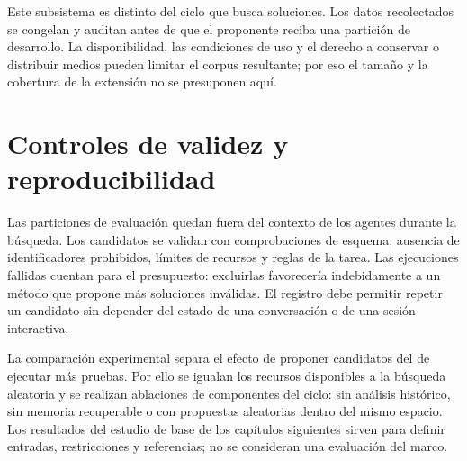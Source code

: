 Este subsistema es distinto del ciclo que busca soluciones. Los datos recolectados se congelan y auditan antes de que el proponente reciba una partición de desarrollo. La disponibilidad, las condiciones de uso y el derecho a conservar o distribuir medios pueden limitar el corpus resultante; por eso el tamaño y la cobertura de la extensión no se presuponen aquí.

\section{Controles de validez y reproducibilidad}

Las particiones de evaluación quedan fuera del contexto de los agentes durante la búsqueda. Los candidatos se validan con comprobaciones de esquema, ausencia de identificadores prohibidos, límites de recursos y reglas de la tarea. Las ejecuciones fallidas cuentan para el presupuesto: excluirlas favorecería indebidamente a un método que propone más soluciones inválidas. El registro debe permitir repetir un candidato sin depender del estado de una conversación o de una sesión interactiva.

La comparación experimental separa el efecto de proponer candidatos del de ejecutar más pruebas. Por ello se igualan los recursos disponibles a la búsqueda aleatoria y se realizan ablaciones de componentes del ciclo: sin análisis histórico, sin memoria recuperable o con propuestas aleatorias dentro del mismo espacio. Los resultados del estudio de base de los capítulos siguientes sirven para definir entradas, restricciones y referencias; no se consideran una evaluación del marco.

